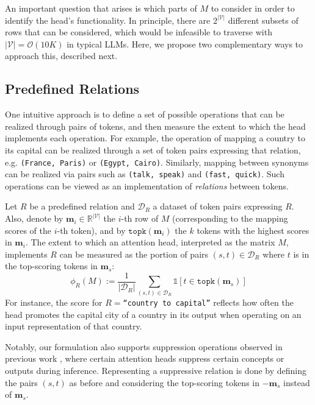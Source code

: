 \documentclass[11pt]{article}
\begin{document}
An important question that arises is which parts of $M$ to consider in order to identify the head's functionality. In principle, there are $2^{|\mathcal{V}|}$ different subsets of rows that can be considered, which would be infeasible to traverse with $|\mathcal{V}| = \mathcal{O}(10K)$ in typical LLMs.
Here, we propose two complementary ways to approach this, described next.

\subsection{Predefined Relations} 
\label{subsec:framework_predefined}
One intuitive approach is to define a set of possible operations that can be realized through pairs of tokens, and then measure the extent to which the head implements each operation. For example, the operation of mapping a country to its capital can be realized through a set of token pairs expressing that relation, e.g. \texttt{(France, Paris)} or \texttt{(Egypt, Cairo)}. Similarly, mapping between synonyms can be realized via pairs such as \texttt{(talk, speak)} and \texttt{(fast, quick)}. Such operations can be viewed as an implementation of \textit{relations} between tokens.

Let $R$ be a predefined relation and $\mathcal{D}_R$ a dataset of token pairs expressing $R$. Also, denote by $\mathbf{m}_i \in \mathbb{R}^{|\mathcal{V}|}$ the $i$-th row of $M$ (corresponding to the mapping scores of the $i$-th token), and by $\texttt{topk}(\mathbf{m}_i)$ the $k$ tokens with the highest scores in $\mathbf{m}_i$. The extent to which an attention head, interpreted as the matrix $M$, implements $R$ can be measured as the portion of pairs $(s,t) \in \mathcal{D}_R$ where $t$ is in the top-scoring tokens in $\mathbf{m}_s$: 
\begin{equation}
\label{eq:relation_score}
    \phi_R(M):=\frac{1}{|\mathcal{D}_R|} \sum_{(s,t)\in \mathcal{D}_R}\mathds{1}[t \in \texttt{topk}(\mathbf{m}_s)]
\end{equation}
For instance, the score for $R=$\texttt{``country to capital''} reflects how often the head promotes the capital city of a country in its output when operating on an input representation of that country.

Notably, our formulation also supports suppression operations observed in previous work \citep{wang2022interpretability, gould2024successor, mcdougall-etal-2024-copy}, where certain attention heads suppress certain concepts or outputs during inference. Representing a suppressive relation is done by defining the pairs $(s,t)$ as before and considering the top-scoring tokens in $-\mathbf{m}_s$ instead of $\mathbf{m}_s$.
\end{document}
